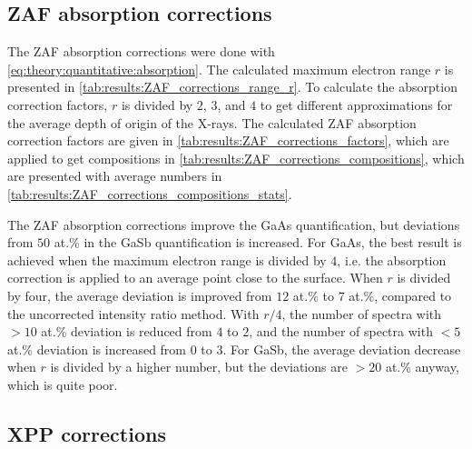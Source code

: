 










\clearpage


\subsection{ZAF absorption corrections}
\label{results:ZAF}

The ZAF absorption corrections were done with \cref{eq:theory:quantitative:absorption}.
The calculated maximum electron range $r$ is presented in \cref{tab:results:ZAF_corrections_range_r}.
To calculate the absorption correction factors, $r$ is divided by $2$, $3$, and $4$ to get different approximations for the average depth of origin of the X-rays.
The calculated ZAF absorption correction factors are given in \cref{tab:results:ZAF_corrections_factors}, which are applied to get compositions in \cref{tab:results:ZAF_corrections_compositions}, which are presented with average numbers in \cref{tab:results:ZAF_corrections_compositions_stats}.


The ZAF absorption corrections improve the GaAs quantification, but deviations from $50$ at.\% in the GaSb quantification is increased.
For GaAs, the best result is achieved when the maximum electron range is divided by $4$, i.e. the absorption correction is applied to an average point close to the surface.
When $r$ is divided by four, the average deviation is improved from $12$ at.\% to $7$ at.\%, compared to the uncorrected intensity ratio method.
With $r/4$, the number of spectra with $> 10$ at.\% deviation is reduced from $4$ to $2$, and the number of spectra with $< 5$ at.\% deviation is increased from $0$ to $3$.
For GaSb, the average deviation decrease when $r$ is divided by a higher number, but the deviations are $> 20$ at.\% anyway, which is quite poor.







\subsection{XPP corrections}
\label{results:XPP}

